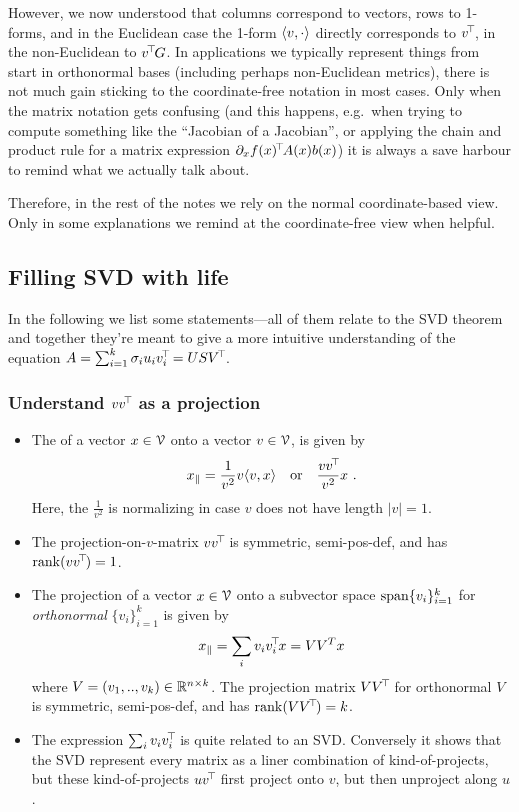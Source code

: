 However, we now understood that columns correspond to vectors, rows to
1-forms, and in the Euclidean case the 1-form $\langle v,\cdot\rangle$ directly
corresponds to $v^{\!\top\!}$, in the non-Euclidean to $v^{\!\top\!} G$. In 
applications we typically represent things from start in orthonormal
bases (including perhaps non-Euclidean metrics), there is not much
gain sticking to the coordinate-free notation in most cases. Only when
the matrix notation gets confusing (and this happens, e.g.\ when
trying to compute something like the ``Jacobian of a Jacobian'', or
applying the chain and product rule for a matrix expression $\partial_x
f(x)^{\!\top\!} A(x) b(x)$) it is always a save harbour to remind what we
actually talk about.

Therefore, in the rest of the notes we rely on the normal
coordinate-based view. Only in some explanations we
remind at the coordinate-free view when helpful.

\subsection{Filling SVD with life}

In the following we list some statements---all of them relate to the
SVD theorem and together they're meant to give a more intuitive
understanding of the equation $A = \sum_{i=1}^k \sigma_i u_i v_i^{\!\top\!} = U S
V^{\!\top\!}$.

\subsubsection{Understand \protect$v v^{\!\top\!}$ as a projection}
\begin{itemize}
\item The  of a vector $x\in{\cal V}$ onto a vector $v\in{\cal V}$, is
given by
\begin{equation}
x_\parallel = \frac{1}{v^2}
v \langle v,x\rangle \quad\text{or}\quad \frac{v v^{\!\top\!}}{v^2} x ~.
\end{equation}
Here, the $\frac{1}{v^2}$ is normalizing in case $v$ does not have
length $|v|=1$.

\item The projection-on-$v$-matrix $v v^{\!\top\!}$ is symmetric, semi-pos-def, and has ${\rm rank}(v v^{\!\top\!})=1$.

\item The projection of a vector $x \in {\cal V}$ onto a subvector space
$\operatorname{span}\{v_i\}_{i=1}^k$ for \emph{orthonormal} $\{v_i\}_{i=1}^k$ is
given by
\begin{equation}
x_\parallel = \sum_i v_i v_i^{\!\top\!} x = V V^T x
\end{equation}
where
$V=(v_1,..,v_k)\in{\mathbb{R}}^{n\times k}$. The projection matrix $V V^{\!\top\!}$
for orthonormal $V$ is symmetric, semi-pos-def, and has ${\rm rank}(V V^{\!\top\!})
= k$.

\item The expression $\sum_i v_i v_i^{\!\top\!}$ is quite related to an SVD. Conversely it shows that the SVD represent every matrix as a liner combination of kind-of-projects, but these kind-of-projects $u v^{\!\top\!}$ first project onto $v$, but then unproject along $u$.
\end{itemize}

